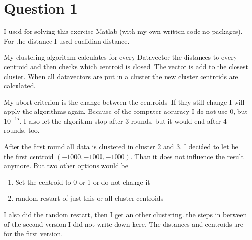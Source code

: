 \section*{Question 1}
I used for solving this exercise Matlab (with my own written code no packages).
For the distance I used euclidian distance.

My clustering algorithm calculates for every Datavector the distances to
every centroid and then checks which centroid is closed. The vector is add to
the closest cluster. When all datavectors are put in a cluster the new cluster
centroids are calculated. 

My abort criterion is the change between the centroids. If they still change I
will apply the algorithms again. Because of the computer accuracy I do not use
0, but $10^{-15}$. I also let the algorithm stop after 3 rounds, but it would
end after 4 rounds, too.

After the first round all data is clustered in cluster 2 and 3. I decided to let
be the first centroid $(-1000,-1000,-1000)$. Than it does not influence the
result anymore. But two other options would be
\begin{enumerate}
  \item Set the centroid to 0 or 1 or do not change it
  \item random restart of just this or all cluster centroids
\end{enumerate}

I also did the random restart, then I get an other clustering. the steps in
between of the second version I did not write down here. The distances and
centroids are for the first version.


